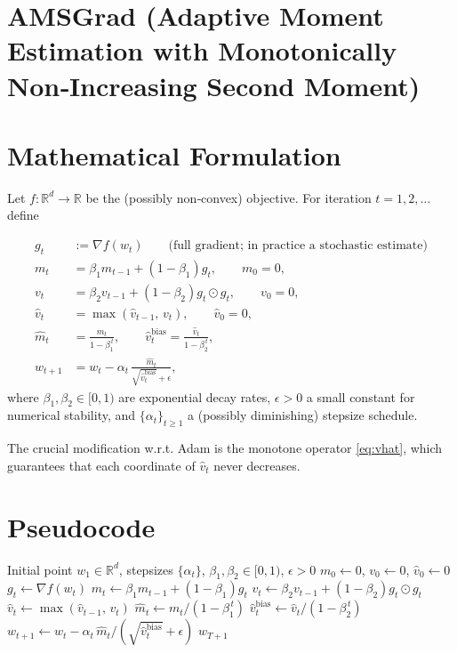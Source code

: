 \documentclass{article}
\begin{document}
\section*{AMSGrad (Adaptive Moment Estimation with Monotonically Non‑Increasing Second Moment)}

\section*{Mathematical Formulation}
Let $f:\mathbb{R}^d\!\to\!\mathbb{R}$ be the (possibly non‑convex) objective.  
For iteration $t=1,2,\dots$ define

\begin{align}
g_t &:= \nabla f(w_t) \qquad\text{(full gradient; in practice a stochastic estimate)}\label{eq:gt}\\[4pt]
m_t &= \beta_1 m_{t-1} + (1-\beta_1) g_t, \qquad m_0 = 0, \label{eq:mt}\\[4pt]
v_t &= \beta_2 v_{t-1} + (1-\beta_2) g_t\odot g_t,\qquad v_0 = 0, \label{eq:vt}\\[4pt]
\hat v_t &= \max(\hat v_{t-1},\, v_t),\qquad \hat v_0 = 0, \label{eq:vhat}\\[4pt]
\hat m_t &= \frac{m_t}{1-\beta_1^{\,t}},\qquad 
\hat v_t^{\text{bias}} = \frac{\hat v_t}{1-\beta_2^{\,t}}, \label{eq:biascorr}\\[4pt]
w_{t+1} &= w_t - \alpha_t \,\frac{\hat m_t}{\sqrt{\hat v_t^{\text{bias}}}+\epsilon},
\end{align}
where $\beta_1,\beta_2\in[0,1)$ are exponential decay rates, $\epsilon>0$ a small constant for numerical stability, and $\{\alpha_t\}_{t\ge 1}$ a (possibly diminishing) stepsize schedule.

The crucial modification w.r.t. Adam is the monotone operator \eqref{eq:vhat}, which guarantees that each coordinate of $\hat v_t$ never decreases.

\section*{Pseudocode}
\begin{algorithm}[H]
\caption{AMSGrad}
\begin{algorithmic}[1]
\REQUIRE Initial point $w_1\in\mathbb{R}^d$, stepsizes $\{\alpha_t\}$, $\beta_1,\beta_2\in[0,1)$, $\epsilon>0$
\STATE $m_0\gets 0$, $v_0\gets 0$, $\hat v_0\gets 0$
    \STATE $g_t \gets \nabla f(w_t)$ 
    \STATE $m_t \gets \beta_1 m_{t-1}+(1-\beta_1)g_t$
    \STATE $v_t \gets \beta_2 v_{t-1}+(1-\beta_2)g_t\odot g_t$
    \STATE $\hat v_t \gets \max(\hat v_{t-1},\,v_t)$ 
    \STATE $\hat m_t \gets m_t/(1-\beta_1^{\,t})$
    \STATE $\hat v_t^{\text{bias}} \gets \hat v_t/(1-\beta_2^{\,t})$
    \STATE $w_{t+1} \gets w_t-\alpha_t\,\hat m_t/(\sqrt{\hat v_t^{\text{bias}}}+\epsilon)$
\ENDFOR
\RETURN $w_{T+1}$
\end{algorithmic}
\end{algorithm}
\end{document}
